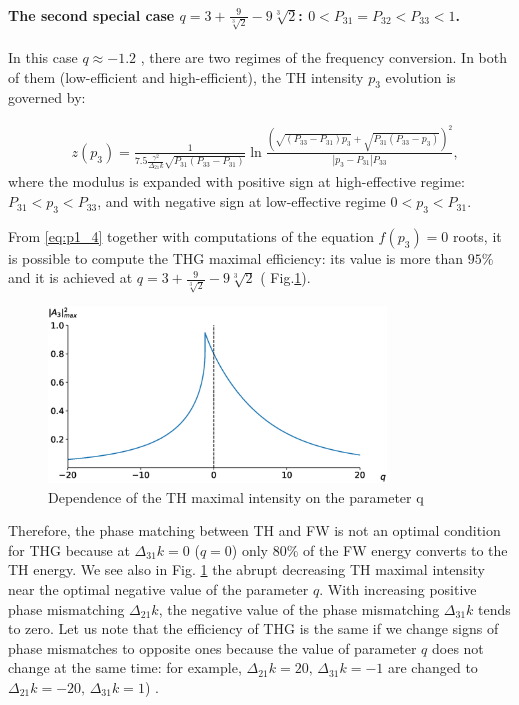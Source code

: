 \documentclass[a4paper, 12pt, onecolumn]{extarticle}
\begin{document}
\paragraph*{The second special case $q=3+\frac{9}{\sqrt[3]{2}}-9\sqrt[3]{2}$: $0<P_{31}=P_{32}<P_{33}<1$.}
In this case $q\approx-1.2$ , there are two regimes of the frequency conversion. In both of them (low-efficient and high-efficient), the TH intensity $p_3$ evolution is governed  by:

\begin{equation}
\label{eq:p1_4}
\begin{aligned}
&z(p_3)=\frac{1}{7.5\frac{\gamma^2}{\Delta_{21}k}\sqrt{P_{31}(P_{33}-P_{31})}}\ln\frac{\left(\sqrt{(P_{33}-P_{31})p_3}+\sqrt{P_{31}(P_{33}-p_3)}\right)^2}{|p_3-P_{31}|P_{33}},
\end{aligned}
\end{equation}
where the modulus is expanded with positive sign at high-effective regime: $P_{31}<p_3<P_{33}$, and with negative sign at low-effective regime $0<p_3<P_{31}$.

 From \eqref{eq:p1_4} together with computations of the equation
$ f(p_3)=0$ roots, it is possible to compute the THG maximal efficiency: its value is more than $95\%$ and it is achieved at $q=3+\frac{9}{\sqrt[3]{2}}-9\sqrt[3]{2}$ ( Fig.\ref{fr:cglp}).
\begin{figure}
    \centering
    \includegraphics[width=0.8\textwidth]{CGLP_curve.eps}
\caption{Dependence of the TH maximal intensity on the parameter q }
\label{fr:cglp}
\end{figure}
Therefore, the phase matching between TH and FW is not an optimal condition for THG because at $\Delta_{31}k=0$ ($q=0$) only $80\%$ of the FW energy converts to the TH energy.  We see also in  Fig. \ref{fr:cglp} the abrupt decreasing TH maximal intensity near the optimal negative value of the parameter $q$. With increasing positive phase mismatching $\Delta_{21}k$, the negative value of the phase mismatching  $\Delta_{31}k$ tends to zero. Let us note that the efficiency of THG is the same if we change signs of phase mismatches to opposite ones because the value of parameter $q$ does not change at the same time: for example, $\Delta_{21}k=20,\,\Delta_{31}k=-1$ are changed to $\Delta_{21}k=-20,\,\Delta_{31}k=1$) .
\end{document}
